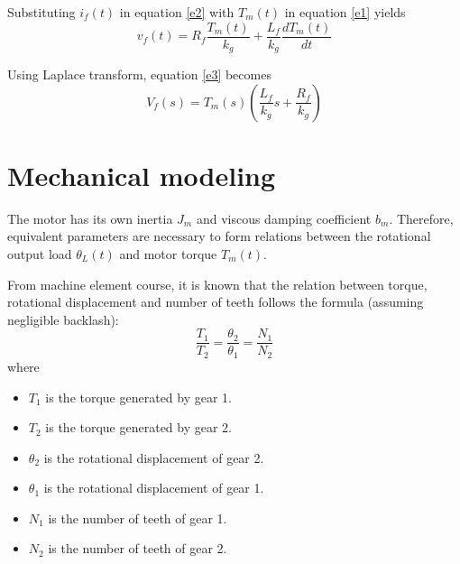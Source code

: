 Substituting $ i_f(t) $ in equation \ref{e2} with $ T_m(t) $ in equation \ref{e1} yields
\begin{equation}\label{e3}
	v_f(t) = R_f\dfrac{T_m(t)}{k_g} + \dfrac{L_f}{k_g}\dfrac{dT_m(t)}{dt}
\end{equation}

Using Laplace transform, equation \ref{e3} becomes
\begin{equation}\label{e4}
	V_f(s) = T_m(s)\left(\dfrac{L_f}{k_g}s + \dfrac{R_f}{k_g}\right)
\end{equation}

\section{Mechanical modeling}
The motor has its own inertia $ J_m $ and viscous damping coefficient $ b_m $. Therefore, equivalent parameters are necessary to form relations between the rotational output load $ \theta_L(t) $ and motor torque $ T_m(t) $.

From machine element course, it is known that the relation between torque, rotational displacement and number of teeth follows the formula (assuming negligible backlash):
\begin{equation}\label{e5}
	\dfrac{T_1}{T_2} = \dfrac{\theta_2}{\theta_1} = \dfrac{N_1}{N_2}
\end{equation}
where
\begin{itemize}
	\item $ T_1 $ is the torque generated by gear 1.
	\item $ T_2 $ is the torque generated by gear 2.
	\item $ \theta_2 $ is the rotational displacement of gear 2.
	\item $ \theta_1 $ is the rotational displacement of gear 1.
	\item $ N_1 $ is the number of teeth of gear 1.
	\item $ N_2 $ is the number of teeth of gear 2.
\end{itemize}

